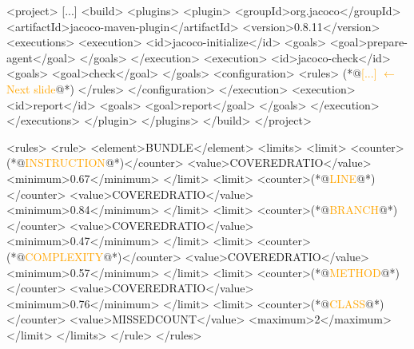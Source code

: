 \documentclass{article}
\begin{document}
\begin{multicols}{2}
{\tiny\begin{ffcode}
<project>
  [...]
  <build>
    <plugins>
      <plugin>
        <groupId>org.jacoco</groupId>
        <artifactId>jacoco-maven-plugin</artifactId>
        <version>0.8.11</version>
        <executions>
          <execution>
            <id>jacoco-initialize</id>
            <goals>
              <goal>prepare-agent</goal>
            </goals>
          </execution>
          <execution>
            <id>jacoco-check</id>
            <goals>
              <goal>check</goal>
            </goals>
            <configuration>
              <rules>
                (*@\textcolor{orange}{[...] \(\leftarrow\) Next slide}@*)
              </rules>
            </configuration>
          </execution>
          <execution>
            <id>report</id>
            <goals>
              <goal>report</goal>
            </goals>
          </execution>
        </executions>
      </plugin>
    </plugins>
  </build>
</project>
\end{ffcode}
}
\end{multicols}
\plush{}

\begin{multicols}{2}
{\tiny\begin{ffcode}
<rules>
  <rule>
    <element>BUNDLE</element>
    <limits>
      <limit>
        <counter>(*@\textcolor{orange}{INSTRUCTION}@*)</counter>
        <value>COVEREDRATIO</value>
        <minimum>0.67</minimum>
      </limit>
      <limit>
        <counter>(*@\textcolor{orange}{LINE}@*)</counter>
        <value>COVEREDRATIO</value>
        <minimum>0.84</minimum>
      </limit>
      <limit>
        <counter>(*@\textcolor{orange}{BRANCH}@*)</counter>
        <value>COVEREDRATIO</value>
        <minimum>0.47</minimum>
      </limit>
      <limit>
        <counter>(*@\textcolor{orange}{COMPLEXITY}@*)</counter>
        <value>COVEREDRATIO</value>
        <minimum>0.57</minimum>
      </limit>
      <limit>
        <counter>(*@\textcolor{orange}{METHOD}@*)</counter>
        <value>COVEREDRATIO</value>
        <minimum>0.76</minimum>
      </limit>
      <limit>
        <counter>(*@\textcolor{orange}{CLASS}@*)</counter>
        <value>MISSEDCOUNT</value>
        <maximum>2</maximum>
      </limit>
    </limits>
  </rule>
</rules>
\end{ffcode}
}
\end{multicols}
\plush{}
\end{document}
